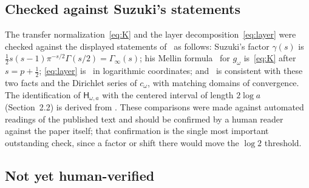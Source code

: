 \documentclass[11pt,a4paper]{article}
\newcommand{\Ginf}{\Gamma_{\!\infty}}
\newcommand{\Hsf}{\mathsf H}
\theoremstyle{plain}
\theoremstyle{definition}
\numberwithin{equation}{section}
\begin{document}
\subsection*{Checked against Suzuki's statements}

The transfer normalization~\eqref{eq:K} and the layer
decomposition~\eqref{eq:layer} were checked against the displayed statements
of~\cite{Suzuki2012} as follows: Suzuki's factor $\gamma(s)$ is
$\tfrac12s(s-1)\pi^{-s/2}\Gamma(s/2)=\Ginf(s)$; his Mellin
formula~\cite[Sect.~3.1]{Suzuki2012} for $g_\omega$ is~\eqref{eq:K} after
$s=p+\tfrac12$; \eqref{eq:layer} is~\cite[eq.~(2.3)]{Suzuki2012} in
logarithmic coordinates; and~\cite[Prop.~2.1]{Suzuki2012} is consistent with
these two facts and the Dirichlet series of $c_\omega$, with matching domains
of convergence. The identification of $\Hsf_{\omega,a}$ with the centered
interval of length $2\log a$ (Section~2.2) is derived from
\cite[eqs.~(2.5)--(2.6)]{Suzuki2012}. These comparisons were made against
automated readings of the published text and should be confirmed by a human
reader against the paper itself; that confirmation is the single most
important outstanding check, since a factor or shift there would move the
$\log2$ threshold.

\subsection*{Not yet human-verified}
\end{document}
